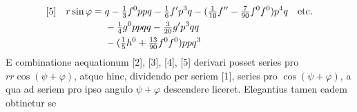 \[
\begin{aligned}
\relax[5]\quad r\sin\varphi={}&q-\tfrac{1}{3}f^0ppq-\tfrac{1}{6}f'p^3q-(\tfrac{1}{10}f''-\tfrac{7}{90}f^0f^0)p^4q\quad\text{etc.}\\
&-\tfrac{1}{4}g^0ppqq-\tfrac{3}{20}g'p^3qq\\
&-(\tfrac{1}{5}h^0+\tfrac{13}{90}f^0f^0)ppq^3
\end{aligned}
\]
E combinatione aequationum [2], [3], [4], [5] derivari posset series pro \(rr\cos(\psi+\varphi)\), atque hinc, dividendo per seriem [1], series pro \(\cos(\psi+\varphi)\), a qua ad seriem pro ipso angulo \(\psi+\varphi\) descendere liceret. Elegantius tamen eadem obtinetur se%
